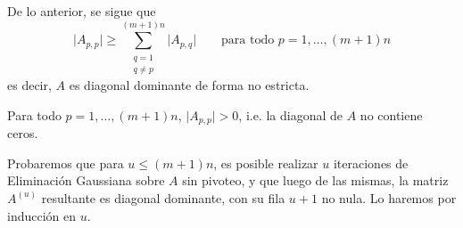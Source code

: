         De lo anterior, se sigue que
          \[ \vert A_{p,p} \vert \geq \sum_{\substack{q=1 \\ q \neq p}}^{(m+1)n} \vert A_{p,q} \vert \qquad \text{para todo $p = 1, \dots, (m+1)n$} \]
        es decir, $A$ es diagonal dominante de forma no estricta.

        \begin{obs}
        \label{obs:Diagonal de A sin ceros}
        Para todo $p = 1, \dots, (m+1)n$, $\vert A_{p,p} \vert > 0$, i.e. la diagonal de $A$ no contiene ceros.
        \end{obs}

        Probaremos que para $u \leq (m+1)n$, es posible realizar $u$ iteraciones de Eliminación Gaussiana sobre $A$ sin pivoteo, y que luego de las mismas, la matriz $A^{(u)}$ resultante es diagonal dominante, con su fila $u + 1$ no nula. Lo haremos por inducción en $u$.

